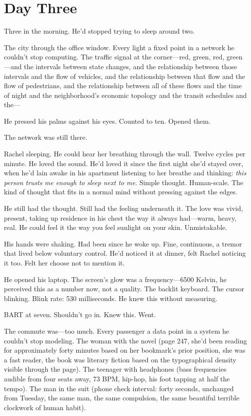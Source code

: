 \chapter{Day Three}

Three in the morning. He'd stopped trying to sleep around two.

The city through the office window. Every light a fixed point in a network he couldn't stop computing. The traffic signal at the corner---red, green, red, green---and the intervals between state changes, and the relationship between those intervals and the flow of vehicles, and the relationship between that flow and the flow of pedestrians, and the relationship between all of these flows and the time of night and the neighborhood's economic topology and the transit schedules and the---

He pressed his palms against his eyes. Counted to ten. Opened them.

The network was still there.

Rachel sleeping. He could hear her breathing through the wall. Twelve cycles per minute. He loved the sound. He'd loved it since the first night she'd stayed over, when he'd lain awake in his apartment listening to her breathe and thinking: \textit{this person trusts me enough to sleep next to me.} Simple thought. Human-scale. The kind of thought that fits in a normal mind without pressing against the edges.

He still had the thought. Still had the feeling underneath it. The love was vivid, present, taking up residence in his chest the way it always had---warm, heavy, real. He could feel it the way you feel sunlight on your skin. Unmistakable.

His hands were shaking. Had been since he woke up. Fine, continuous, a tremor that lived below voluntary control. He'd noticed it at dinner, felt Rachel noticing it too. Felt her choose not to mention it.

He opened his laptop. The screen's glow was a frequency---6500 Kelvin, he perceived this as a number now, not a quality. The backlit keyboard. The cursor blinking. Blink rate: 530 milliseconds. He knew this without measuring.

\bigskip

BART at seven. Shouldn't go in. Knew this. Went.

The commute was---too much. Every passenger a data point in a system he couldn't stop modeling. The woman with the novel (page 247, she'd been reading for approximately forty minutes based on her bookmark's prior position, she was a fast reader, the book was literary fiction based on the typographical density visible through the page). The teenager with headphones (bass frequencies audible from four seats away, 73 BPM, hip-hop, his foot tapping at half the tempo). The man in the suit (phone check interval: forty seconds, unchanged from Tuesday, the same man, the same compulsion, the same beautiful terrible clockwork of human habit).

